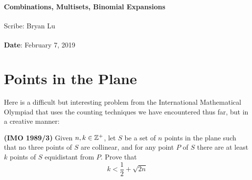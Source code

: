 \documentclass[11pt,twosided]{article}
\def\titlestring{Combinations, Multisets, Binomial Expansions}
\def\scribestring{Bryan Lu}
\def\datestring{February 7, 2019}
\begin{document}
\thispagestyle{plain}  %

\noindent
{\LARGE \textbf{\titlestring}}\\\\
%
{\Large Scribe: \scribestring}\\ \\
{\textbf{Date}: \datestring}


\noindent



\section{Points in the Plane}
Here is a difficult but interesting problem from the International Mathematical Olympiad that uses the counting techniques we have encountered thus far, but in a creative manner:
\begin{problem}{1} 
\textbf{(IMO 1989/3)} Given $n, k \in \mathbb{Z}^+$, let $S$ be a set of $n$ points in the plane such that no three points of $S$ are collinear, and for any point $P$ of $S$ there are at least $k$ points of $S$ equidistant from $P$. Prove that 
\[
	k < \frac{1}{2} + \sqrt{2n}
\]
\end{problem}
\end{document}

